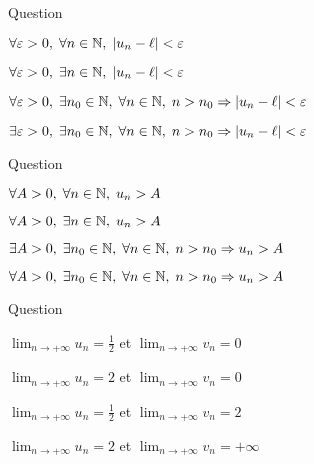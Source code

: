 

\begin{multi}[multiple,feedback=
{C'est la définition de \(\displaystyle \lim _{n\to +\infty}u_n=\ell\) : \(\forall \varepsilon >0,\; \exists n_0\in \Nn,\; \forall n\in \Nn,\; n>n_0\Rightarrow |u_n-\ell|<\varepsilon\).
}]{Question}
    \item \(\forall \varepsilon >0,\; \forall n\in \mathbb{N},\; |u_n-\ell|<\varepsilon\)
    \item \(\forall \varepsilon >0,\; \exists n\in \mathbb{N},\; |u_n-\ell|<\varepsilon\)
    \item* \(\forall \varepsilon >0,\; \exists n_0\in \Nn,\; \forall n\in \Nn,\; n>n_0\Rightarrow |u_n-\ell|<\varepsilon\)
    \item \(\exists \varepsilon >0,\; \exists n_0\in \mathbb{N},\; \forall n\in \mathbb{N},\; n>n_0\Rightarrow |u_n-\ell|<\varepsilon\)
\end{multi}


\begin{multi}[multiple,feedback=
{C'est la définition \(\displaystyle \lim _{n\to +\infty}u_n=+\infty\) : \(\forall A>0,\; \exists n_0\in \Nn,\; \forall n\in \Nn,\; n>n_0\Rightarrow u_n>A\).
}]{Question}
    \item \(\forall A>0,\; \forall n\in \mathbb{N},\; u_n>A\)
    \item \(\forall A>0,\; \exists n\in \mathbb{N},\; u_n>A\)
    \item \(\exists A>0,\; \exists n_0\in \mathbb{N},\; \forall n\in \mathbb{N},\; n>n_0\Rightarrow u_n>A\)
    \item* \(\forall A>0,\; \exists n_0\in \Nn,\; \forall n\in \Nn,\; n>n_0\Rightarrow u_n>A\)
\end{multi}


\begin{multi}[multiple,feedback=
{D'abord, \(\displaystyle u_n=\frac{n^2\left(1+\frac{1}{n^2}\right)}{n^2\left(2-\frac{1}{n^2}\right)}=\frac{1+\frac{1}{n^2}}{2-\frac{1}{n^2}}\). Or, \(\displaystyle \lim _{n\to +\infty}\frac{1}{n^2}=0\). Donc \(\displaystyle \lim _{n\to +\infty}u_n=\frac{1+0}{2-0}=\frac{1}{2}\). De même, \(\displaystyle v_n=\frac{n\left(2+\frac{1}{n}\right)}{n^2\left(1-\frac{1}{n^2}\right)}=\frac{1}{n}\times\frac{2+\frac{1}{n}}{1-\frac{1}{n^2}}\) et donc \(\displaystyle \lim _{n\to +\infty}v_n=0\).
}]{Question}
    \item* \(\displaystyle \lim _{n\to +\infty}u_n=\frac{1}{2}\) et \(\displaystyle \lim _{n\to +\infty}v_n=0\)
    \item \(\displaystyle \lim _{n\to +\infty}u_n=2\) et \(\displaystyle \lim _{n\to +\infty}v_n=0\)
    \item \(\displaystyle \lim _{n\to +\infty}u_n=\frac{1}{2}\) et \(\displaystyle \lim _{n\to +\infty}v_n=2\)
    \item \(\displaystyle \lim _{n\to +\infty}u_n=2\) et \(\displaystyle \lim _{n\to +\infty}v_n=+\infty\)
\end{multi}


